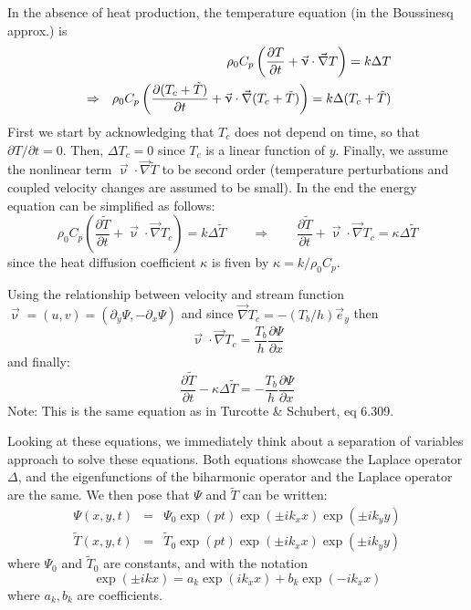 In the absence of heat production, the temperature equation (in the Boussinesq approx.) is 
\begin{eqnarray}
&& \rho_0 C_p \left( \frac{\partial T}{\partial t} + {\vec \upnu}\cdot {\vec \nabla} T \right) 
= k \Delta T \nonumber\\
&\Rightarrow&
\rho_0 C_p \left( \frac{\partial (T_c+\tilde{T})}{\partial t} + {\vec \upnu}\cdot {\vec \nabla} 
(T_c+\tilde{T}) \right) 
= k \Delta (T_c+\tilde{T})
\end{eqnarray}
First we start by acknowledging that $T_c$ does not depend on time, 
so that $\partial T/\partial t = 0$.
Then, $\Delta T_c=0$ since $T_c$ is a linear function of $y$.
Finally, we assume the nonlinear 
term ${\vec \upnu}\cdot {\vec \nabla} \tilde{T} $ to be second order (temperature perturbations and 
coupled velocity changes are assumed to be small).
In the end the energy equation can be simplified as follows:
\[
\rho_0 C_p \left( \frac{\partial \tilde{T}}{\partial t} + {\vec \upnu}\cdot {\vec \nabla} T_c \right) 
= k \Delta \tilde{T}
\qquad
\Rightarrow
\qquad
\frac{\partial \tilde{T}}{\partial t} + {\vec \upnu}\cdot {\vec \nabla} T_c 
= \kappa \Delta \tilde{T}
\]
since the heat diffusion coefficient $\kappa$ is fiven by $\kappa =k/\rho_0 C_p$.

Using the relationship between velocity and stream function
$\vec\upnu=(u,v)=(\partial_y \Psi, -\partial_x \Psi)$ and 
since $\vec\nabla T_c = - (T_b/h) \vec{e}_y$ then
\[
{\vec \upnu}\cdot {\vec \nabla} T_c =  \frac{T_b}{h}   \frac{\partial \Psi}{\partial x} 
\]
and finally:
\begin{equation}
\boxed{
\frac{\partial \tilde{T}}{\partial t} - \kappa \Delta \tilde{T} 
= -  \frac{T_b}{h}   \frac{\partial \Psi}{\partial x}
}
\end{equation}
Note: This is the same equation as in Turcotte \& Schubert, eq 6.309.

Looking at these equations, we immediately think about a separation of variables approach to solve these
equations. Both equations showcase the Laplace operator $\Delta$, and the eigenfunctions of the biharmonic operator and the Laplace operator are the same. 
We then pose that $\Psi$ and $\tilde{T}$ can be written:
\begin{eqnarray}
\Psi(x,y,t) &=& \Psi_0 \exp(pt)\exp(\pm i k_x x) \exp(\pm i k_y y) \\ %
\tilde{T}(x,y,t) &=& \tilde{T}_0 \exp(pt) \exp(\pm i k_x x) \exp(\pm i k_y y) %
\end{eqnarray}
where $\Psi_0$ and $\tilde{T}_0$ are constants, and with the notation
\[
\exp (\pm i k x) = a_k \exp (i k_x x) + b_k \exp (-i k_x x )
\]
where $a_k,b_k$ are coefficients. 


